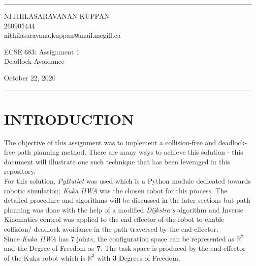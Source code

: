 \documentclass[a4paper]{article}
\begin{document}

\fancyhead[C]{}
\hrule \medskip %
\begin{minipage}{0.295\textwidth} 
\raggedright
\footnotesize
NITHILASARAVANAN KUPPAN \hfill\\   
260905444\hfill\\
nithilasaravana.kuppan@mail.mcgill.ca
\end{minipage}
\begin{minipage}{0.4\textwidth} 
\centering 
\large 
ECSE 683: Assignment 1\\ 
\normalsize 
Deadlock Avoidance\\ 
\end{minipage}
\begin{minipage}{0.295\textwidth} 
\raggedleft
{\text October 22, 2020}\hfill\\
\end{minipage}
\medskip\hrule 
\bigskip


\section{INTRODUCTION}
The objective of this assignment was to implement a collision-free and deadlock-free path planning method. There are many ways to achieve this solution - this document will illustrate one such technique that has been leveraged in this repository.\\

For this solution, {\it PyBullet} was used which is a Python module dedicated towards robotic simulation; {\it Kuka IIWA} was the chosen robot for this process. The detailed procedure and algorithms will be discussed in the later sections but path planning was done with the help of a modified {\it Dijkstra's} algorithm and Inverse Kinematics control was applied to the end effector of the robot to enable collision/ deadlock avoidance in the path traversed by the end effector.\\

Since {\it Kuka IIWA} has 7 joints, the configuration space can be represented as \textbf{$\mathbb{R}^7$} and the Degree of Freedom as \textbf{7}. The task space is produced by the end effector of the Kuka robot which is \textbf{$\mathbb{R}^3$} with \textbf{3} Degrees of Freedom.\\
\end{document}
